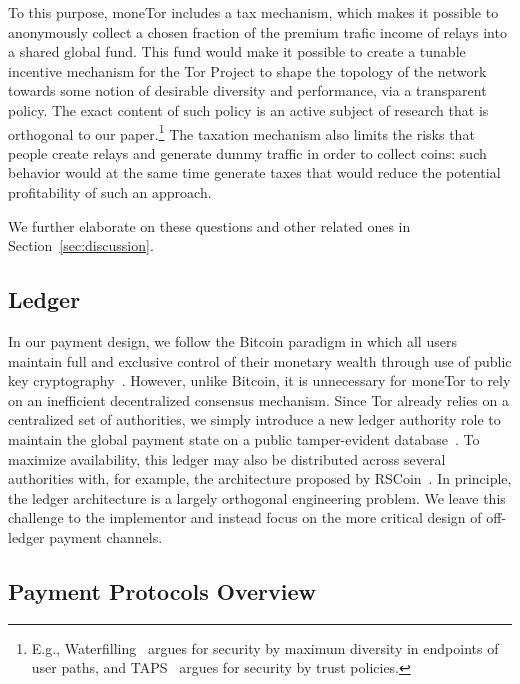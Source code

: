 To this purpose, moneTor includes a tax mechanism, which makes it possible to anonymously collect a chosen fraction of the premium trafic income of relays into a shared global fund.
This fund would make it possible to create a tunable incentive mechanism for the Tor Project to shape the topology of the network towards some notion of desirable diversity and performance, via a transparent policy.
The exact content of such policy is an active subject of research that is orthogonal to our paper.\footnote{E.g., Waterfilling~\cite{waterfilling-pets2017} argues for security by maximum diversity in endpoints of user paths, and TAPS~\cite{taps-ndss2017} argues for security by trust policies.}
The taxation mechanism also limits the risks that people create relays and generate dummy traffic in order to collect coins: such behavior would at the same time generate taxes that would reduce the potential profitability of such an approach.

We further elaborate on these questions and other related ones in
Section~\ref{sec:discussion}.

\subsection{Ledger}

In our payment design, we follow the Bitcoin paradigm in which all users maintain full and exclusive control of their monetary wealth through use of public key cryptography~\cite{nakamoto2008bitcoin}.
However, unlike Bitcoin, it is unnecessary for moneTor to rely on an inefficient decentralized consensus mechanism.
Since Tor already relies on a centralized set of authorities, we simply introduce a new ledger authority role to maintain the global payment state on a public tamper-evident database~\cite{crosby2009efficient}.
To maximize availability, this ledger may also be distributed across several authorities with, for example, the architecture proposed by RSCoin~\cite{danezis2015centrally}.
In principle, the ledger architecture is a largely orthogonal engineering problem.
We leave this challenge to the implementor and instead focus on the more critical design of off-ledger payment channels.

\subsection{Payment Protocols Overview}
\label{sec:payment_overview}

